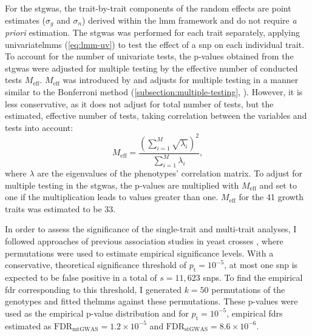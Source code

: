 For the \gls{stgwas}, the trait-by-trait components of the random effects are point estimates (\(\sigma_g\) and \(\sigma_n\)) derived within the \gls{lmm} framework and do not require \textit{a priori} estimation. The \gls{stgwas} was performed for each trait separately, applying univariate\glspl{lmm} (\cref{eq:lmm-uv}) to test the effect of a \gls{snp} on each individual trait. To account for the number of univariate tests, the p-values obtained from the \gls{stgwas} were adjusted for multiple testing by the effective number of conducted tests \(M_\text{eff}\). \(M_\text{eff}\) was introduced by \citet{Galwey2009} and adjusts for multiple testing in a manner similar to the Bonferroni method (\cref{subsection:multiple-testing}, \citep{Dunn1961}). However, it is less conservative, as it does not adjust for total number of tests, but the estimated, effective number of tests, taking correlation between the 
variables and tests into account:
\begin{equation}
 M_\text{eff} = \frac{(\sum^M_{i=1} \sqrt{\lambda_i})^2}{\sum^M_{i=1}\lambda_i},
 \label{eq:meff}
\end{equation}
 where \(\lambda\) are the eigenvalues of the phenotypes' correlation matrix. To adjust for multiple testing in the \gls{stgwas}, the p-values are multiplied with \(M_\text{eff}\) and set to one if the multiplication leads to values greater than one. \(M_\text{eff}\) for the \num{41} growth traits was estimated to be \num{33}. 
 
In order to assess the significance of the single-trait and multi-trait analyses, I followed approaches of previous association studies in yeast crosses \citep{Brem2002,Brem2005,Ehrenreich2010}, where permutations were used to estimate empirical significance levels. With a conservative, theoretical significance threshold of \(p_\text{t}=10^{-5}\), at most one \gls{snp} is expected to be false positive in a total of \(s = 11,623\) \glspl{snp}. To find the empirical \gls{fdr} corresponding to this threshold, I generated \(k = 50\) permutations of the genotypes and fitted the\glspl{lmm} against these permutations. These p-values were used as the empirical p-value distribution and for \(p_\text{t}=10^{-5}\), empirical \glspl{fdr} estimated as 
\(\text{FDR}_{\text{mtGWAS}} =1.2 \times 10^{-5}\) and \(\text{FDR}_{\text{stGWAS}} =8.6 \times 10^{-6}\).

